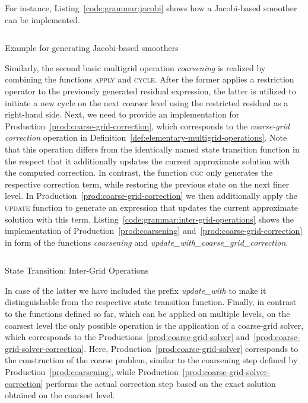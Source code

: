 For instance, Listing~\ref{code:grammar:jacobi} shows how a Jacobi-based smoother can be implemented.
\begin{listing}
	\inputminted{python}{evostencils/grammar/jacobi.py}
	\caption{Example for generating Jacobi-based smoothers}
	\label{code:grammar:jacobi}
\end{listing}
Similarly, the second basic multigrid operation \emph{coarsening} is realized by combining the functions \textsc{apply} and \textsc{cycle}.
After the former applies a restriction operator to the previously generated residual expression, the latter is utilized to initiate a new cycle on the next coarser level using the restricted residual as a right-hand side.
Next, we need to provide an implementation for Production~\ref{prod:coarse-grid-correction}, which corresponds to the \emph{coarse-grid correction} operation in Definition~\ref{def:elementary-multigrid-operations}.
Note that this operation differs from the identically named state transition function in the respect that it additionally updates the current approximate solution with the computed correction.
In contrast, the function \textsc{cgc} only generates the respective correction term, while restoring the previous state on the next finer level.
In Production~\ref{prod:coarse-grid-correction} we then additionally apply the \textsc{update} function to generate an expression that updates the current approximate solution with this term.
Listing~\ref{code:grammar:inter-grid-operations} shows the implementation of Production~\ref{prod:coarsening} and~\ref{prod:coarse-grid-correction} in form of the functions \textsl{coarsening} and \emph{update\_with\_coarse\_grid\_correction}.
\begin{listing}
	\inputminted{python}{evostencils/grammar/inter_grid_operations.py}
	\caption{State Transition: Inter-Grid Operations}
	\label{code:grammar:inter-grid-operations}
\end{listing}
In case of the latter we have included the prefix \emph{update\_with} to make it distinguishable from the respective state transition function.
Finally, in contrast to the functions defined so far, which can be applied on multiple levels, on the coarsest level the only possible operation is the application of a coarse-grid solver, which corresponds to the Productions~\ref{prod:coarse-grid-solver} and~\ref{prod:coarse-grid-solver-correction}.
Here, Production~\ref{prod:coarse-grid-solver} corresponds to the construction of the coarse problem, similar to the coarsening step defined by Production~\ref{prod:coarsening}, while Production~\ref{prod:coarse-grid-solver-correction} performs the actual correction step based on the exact solution obtained on the coarsest level. 
